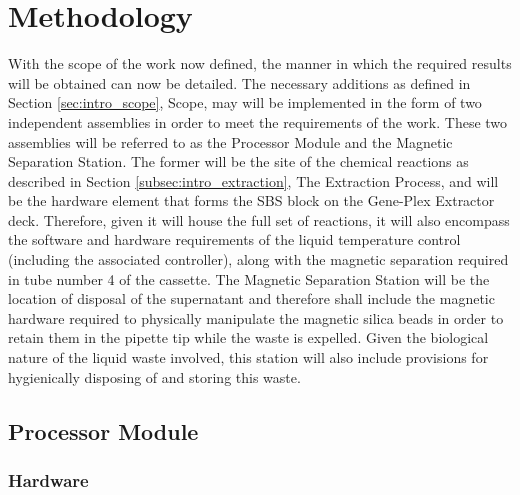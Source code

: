 \chapter{Methodology}
\label{cha:methodology}

With the scope of the work now defined, the manner in which the required results will be obtained can now be detailed. The necessary additions as defined in Section \ref*{sec:intro_scope}, Scope, may will be implemented in the form of two independent assemblies in order to meet the requirements of the work. These two assemblies will be referred to as the Processor Module and the Magnetic Separation Station. The former will be the site of the chemical reactions as described in Section \ref{subsec:intro_extraction}, The Extraction Process, and will be the hardware element that forms the SBS block on the Gene-Plex Extractor deck. Therefore, given it will house the full set of reactions, it will also encompass the software and hardware requirements of the liquid temperature control (including the associated controller), along with the magnetic separation required in tube number 4 of the cassette. The Magnetic Separation Station will be the location of disposal of the supernatant and therefore shall include the magnetic hardware required to physically manipulate the magnetic silica beads in order to retain them in the pipette tip while the waste is expelled. Given the biological nature of the liquid waste involved, this station will also include provisions for hygienically disposing of and storing this waste.

\section{Processor Module}

\subsection{Hardware}

